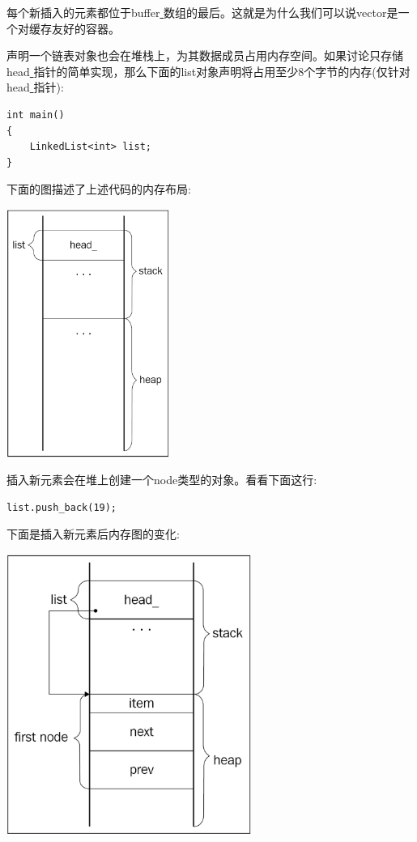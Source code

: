 每个新插入的元素都位于buffer\underline{ }数组的最后。这就是为什么我们可以说vector是一个对缓存友好的容器。 \par
声明一个链表对象也会在堆栈上，为其数据成员占用内存空间。如果讨论只存储head\underline{ }指针的简单实现，那么下面的list对象声明将占用至少8个字节的内存(仅针对head\underline{ }指针): \par

\begin{lstlisting}[caption={}]
int main()
{
	LinkedList<int> list;
}
\end{lstlisting}

下面的图描述了上述代码的内存布局: \par

\begin{center}
	\includegraphics[width=0.4\textwidth]{content/Section-2/Chapter-6/11}
\end{center}

插入新元素会在堆上创建一个node类型的对象。看看下面这行: \par

\begin{lstlisting}[caption={}]
list.push_back(19);
\end{lstlisting}

下面是插入新元素后内存图的变化: \par

\begin{center}
	\includegraphics[width=0.6\textwidth]{content/Section-2/Chapter-6/12}
\end{center}

